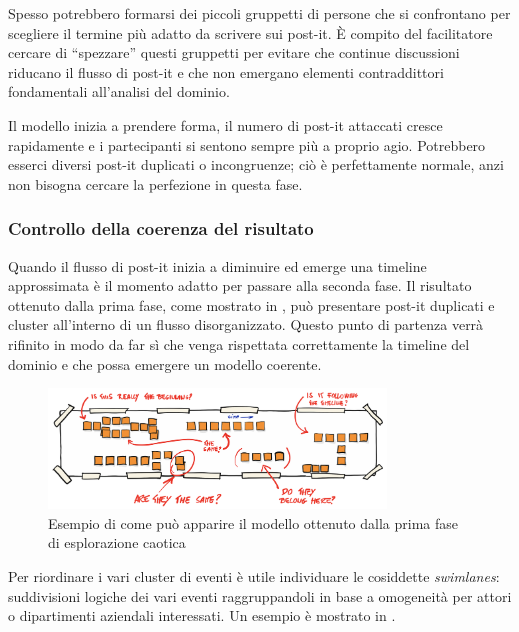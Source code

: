 Spesso potrebbero formarsi dei piccoli gruppetti di persone che si confrontano per scegliere il termine più adatto da scrivere sui post-it. È compito del facilitatore cercare di ``spezzare'' questi gruppetti per evitare che continue discussioni riducano il flusso di post-it e che non emergano elementi contraddittori fondamentali all'analisi del dominio.

Il modello inizia a prendere forma, il numero di post-it attaccati cresce rapidamente e i partecipanti si sentono sempre più a proprio agio. Potrebbero esserci diversi post-it duplicati o incongruenze; ciò è perfettamente normale, anzi non bisogna cercare la perfezione in questa fase.

\subsubsection{Controllo della coerenza del risultato}
\label{sec:prima-riunione-controllo-della-coerenza-del-risultato}

Quando il flusso di post-it inizia a diminuire ed emerge una timeline approssimata è il momento adatto per passare alla seconda fase. Il risultato ottenuto dalla prima fase, come mostrato in , può presentare post-it duplicati e cluster all'interno di un flusso disorganizzato. Questo punto di partenza verrà rifinito in modo da far sì che venga rispettata correttamente la timeline del dominio e che possa emergere un modello coerente.

\begin{figure}[!ht]
  \centering
  \includegraphics[width=0.8\textwidth]{images/event-storming-exploration.png}
  \caption{Esempio di come può apparire il modello ottenuto dalla prima fase di esplorazione caotica}
  \label{fig:event-storming-exploration}
\end{figure}

Per riordinare i vari cluster di eventi è utile individuare le cosiddette \emph{swimlanes}: suddivisioni logiche dei vari eventi raggruppandoli in base a omogeneità per attori o dipartimenti aziendali interessati. Un esempio è mostrato in .


